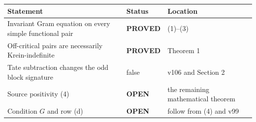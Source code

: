 \documentclass[11pt]{article}
\newcommand{\PROVED}{\textcolor{green!40!black}{\textbf{PROVED}}}
\newcommand{\OPEN}{\textcolor{red!70!black}{\textbf{OPEN}}}
\begin{document}
\begin{center}
\begin{tabular}{>{\raggedright\arraybackslash}p{.58\linewidth}
                >{\centering\arraybackslash}p{.15\linewidth}
                >{\raggedright\arraybackslash}p{.17\linewidth}}
\toprule
Statement & Status & Location \\
\midrule
Invariant Gram equation on every simple functional pair & \PROVED & (1)--(3) \\
Off-critical pairs are necessarily Krein-indefinite & \PROVED & Theorem 1 \\
Tate subtraction changes the odd block signature & false & v106 and Section 2 \\
Source positivity (4) & \OPEN & the remaining mathematical theorem \\
Condition $G$ and row (d) & \OPEN & follow from (4) and v99 \\
\bottomrule
\end{tabular}
\end{center}
\end{document}
